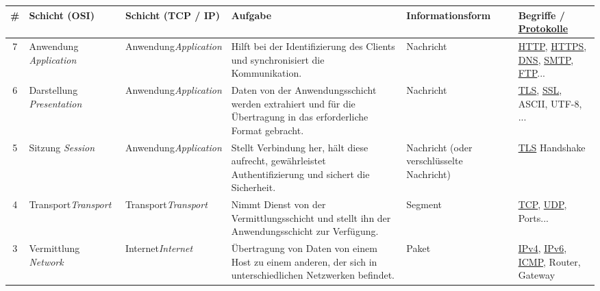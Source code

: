 \documentclass[border=10pt]{standalone}
\begin{document}
\begin{tabular}{c|m{2.6cm}||m{2cm}||m{4.6cm}|m{2.5cm}|m{2cm}}
		\textbf{\#}              & \textbf{Schicht (OSI)}                     & \textbf{Schicht \newline (TCP / IP)}  & \textbf{Aufgabe}                                                                                                & \textbf{Informations\-form}               & \textbf{Begriffe / \newline \underline{Protokolle}}   \\ \midrule\midrule
		\rowcolor{applicationLayerColor!10}7    & Anwendung \newline \textit{Application}    & Anwendung\newline\textit{Application} & Hilft bei der Identifizierung des Clients und synchronisiert die Kommunikation.                                 & Nachricht                                 & \underline{HTTP}, \underline{HTTPS}, \underline{DNS}, \underline{SMTP}, \underline{FTP}...        \\\midrule
		\rowcolor{applicationLayerColor!20}6    & Darstellung \newline \textit{Presentation} & Anwendung\newline\textit{Application} & Daten von der Anwendungsschicht werden extrahiert und f\"ur die \"Ubertragung in das erforderliche Format gebracht. & Nachricht                                 & \underline{TLS}, \underline{SSL}, ASCII, UTF-8, ...      \\\midrule
		\rowcolor{yellow!30}5    & Sitzung \newline \textit{Session}          & Anwendung\newline\textit{Application} & Stellt Verbindung her, h\"alt diese aufrecht, gew\"ahrleistet Authentifizierung und sichert die Sicherheit.         & Nachricht (oder verschl\"usselte Nachricht) & \underline{TLS} Handshake           \\\midrule
		\rowcolor{transportLayerColor!20}4    & Transport\newline \textit{Transport}       & Transport\newline\textit{Transport}   & Nimmt Dienst von der Vermittlungsschicht und stellt ihn der Anwendungsschicht zur Verf\"ugung.                    & Segment                                   & \underline{TCP}, \underline{UDP}, Ports... \\\midrule
		\rowcolor{networkLayerColor!20}3 & Vermittlung \newline \textit{Network}      & Internet\newline\textit{Internet}     & \"Ubertragung von Daten von einem Host zu einem anderen, der sich in unterschiedlichen Netzwerken befindet.       & Paket                                     & \underline{IPv4}, \underline{IPv6}, \underline{ICMP}, Router, Gateway   \\\midrule

\end{tabular}
\end{document}

